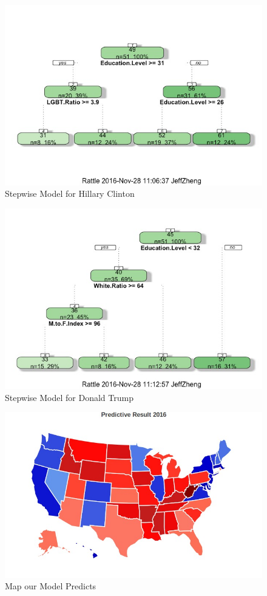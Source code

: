 \documentclass{article}
\begin{document}
{\begin{figure}[!htb]
  \centering
    \includegraphics[scale=0.5]{StepwiseClinton}
  \caption{Stepwise Model for Hillary Clinton}
\end{figure}  

\begin{figure}[!htb]
  \centering
    \includegraphics[scale=0.5]{StepwiseTrump}
  \caption{Stepwise Model for Donald Trump}
\end{figure}

\begin{figure}[!htb]
  \centering
    \includegraphics[scale=0.5]{ModelPredictionMap}
  \caption{Map our Model Predicts}
\end{figure}  

}
\end{document}
